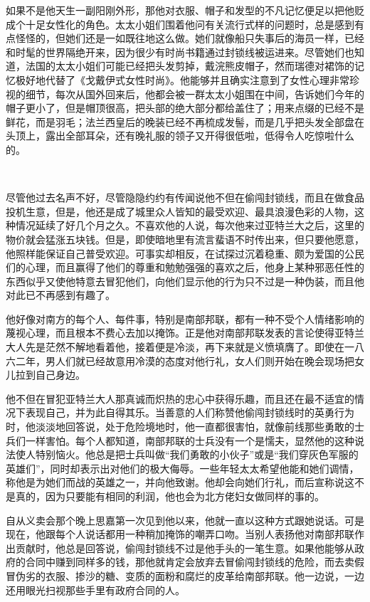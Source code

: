 \par 如果不是他天生一副阳刚外形，那他对衣服、帽子和发型的不凡记忆便足以把他贬成个十足女性化的角色。太太小姐们围着他问有关流行式样的问题时，总是感到有点怪怪的，但她们还是一如既往地这么做。她们就像船只失事后的海员一样，已经和时髦的世界隔绝开来，因为很少有时尚书籍通过封锁线被运进来。尽管她们也知道，法国的太太小姐们可能已经把头发剪掉，戴浣熊皮帽子，然而瑞德对裙饰的记忆极好地代替了《戈戴伊式女性时尚》。他能够并且确实注意到了女性心理非常珍视的细节，每次从国外回来后，他都会被一群太太小姐围在中间，告诉她们今年的帽子更小了，但是帽顶很高，把头部的绝大部分都给盖住了；用来点缀的已经不是鲜花，而是羽毛；法兰西皇后的晚装已经不再梳成发髻，而是几乎把头发全部盘在头顶上，露出全部耳朵，还有晚礼服的领子又开得很低啦，低得令人吃惊啦什么的。
\par  
\par 尽管他过去名声不好，尽管隐隐约约有传闻说他不但在偷闯封锁线，而且在做食品投机生意，但是，他还是成了城里众人皆知的最受欢迎、最具浪漫色彩的人物，这种情况延续了好几个月之久。不喜欢他的人说，每次他来过亚特兰大之后，这里的物价就会猛涨五块钱。但是，即使暗地里有流言蜚语不时传出来，但只要他愿意，他照样能保证自己普受欢迎。可事实却相反，在试探过沉着稳重、颇为爱国的公民们的心理，而且赢得了他们的尊重和勉勉强强的喜欢之后，他身上某种邪恶任性的东西似乎又使他特意去冒犯他们，向他们显示他的行为只不过是一种伪装，而且他对此已不再感到有趣了。
\par 他好像对南方的每个人、每件事，特别是南部邦联，都有一种不受个人情绪影响的蔑视心理，而且根本不费心去加以掩饰。正是他对南部邦联发表的言论使得亚特兰大人先是茫然不解地看着他，接着便是冷淡，再下来就是义愤填膺了。即使在一八六二年，男人们就已经故意用冷漠的态度对他行礼，女人们则开始在晚会现场把女儿拉到自己身边。
\par 他不但在冒犯亚特兰大人那真诚而炽热的忠心中获得乐趣，而且还在最不适宜的情况下表现自己，并为此自得其乐。当善意的人们称赞他偷闯封锁线时的英勇行为时，他淡淡地回答说，处于危险境地时，他一直都很害怕，就像前线那些勇敢的士兵们一样害怕。每个人都知道，南部邦联的士兵没有一个是懦夫，显然他的这种说法使人特别恼火。他总是把士兵叫做“我们勇敢的小伙子”或是“我们穿灰色军服的英雄们”，同时却表示出对他们的极大侮辱。一些年轻太太希望他能和她们调情，称他是为她们而战的英雄之一，并向他致谢。他却会向她们行礼，而后宣称说这不是真的，因为只要能有相同的利润，他也会为北方佬妇女做同样的事的。
\par 自从义卖会那个晚上思嘉第一次见到他以来，他就一直以这种方式跟她说话。可是现在，他跟每个人说话都用一种稍加掩饰的嘲弄口吻。当别人表扬他对南部邦联作出贡献时，他总是回答说，偷闯封锁线不过是他手头的一笔生意。如果他能够从政府的合同中赚到同样多的钱，那他就肯定会放弃去冒偷闯封锁线的危险，而去卖假冒伪劣的衣服、掺沙的糖、变质的面粉和腐烂的皮革给南部邦联。他一边说，一边还用眼光扫视那些手里有政府合同的人。
